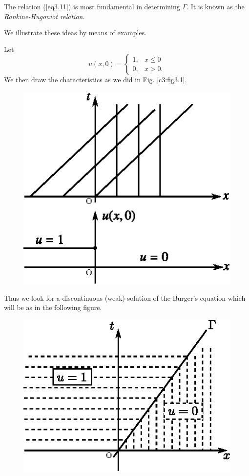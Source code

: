 The relation (\ref{eq3.11}) is most fundamental in determining $\Gamma$. It is
known as the {\em Rankine-Hugoniot relation}.

We illustrate these ideas by means of examples.

\begin{exam}\label{chap3:exam3.1}
Let
$$
u(x,0) = 
\begin{cases}
1, & x \leq 0\\
0, & x > 0.
\end{cases}
$$
We then draw the characteristics as we did in Fig. \ref{c3:fig3.1}.

\begin{figure}[H]
\centering
\includegraphics{figures/fig52-3.3.eps}
\caption{}\label{c3:fig3.3}
\end{figure}\pageoriginale

Thus we look for a discontinuous (weak) solution of the Burger's
equation which will be as in the following figure.

\begin{figure}[H]
\centering
\includegraphics{figures/fig52-3.4.eps}
\caption{}\label{c3:fig3.4}
\end{figure}


\end{exam}

